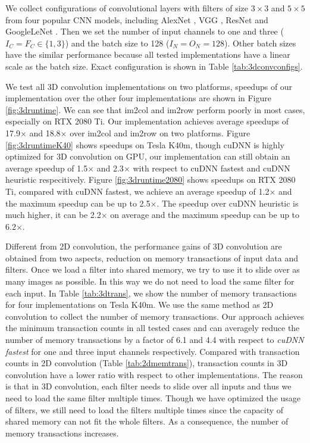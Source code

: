 We collect configurations of convolutional layers with filters of size $3 \times 3$ and $5 \times 5$ from four popular CNN models,
including AlexNet \cite{Krizhevsky2012ImageNet}, VGG \cite{SimonyanZ14a}, ResNet \cite{HeZRS16} and GoogleLeNet \cite{SzegedyLJSRAEVR15}.
Then we set the number of input channels to one and three ($I_C=F_C \in \{1, 3\}$) and the batch size to 128 ($I_N=O_N=128$). Other batch
sizes have the similar performance because all tested implementations have a linear scale as the batch size. Exact configuration is shown
in Table \ref{tab:3dconvconfigs}.

We test all 3D convolution implementations on two platforms, speedups of our implementation over the other four implementations are shown
in Figure \ref{fig:3druntime}. We can see that im2col and im2row perform poorly in most cases, especially on RTX 2080 Ti. Our
implementation achieves average speedups of 17.9$\times$ and 18.8$\times$ over im2col and im2row on two platforms. Figure
\ref{fig:3druntimeK40} shows speedups on Tesla K40m, though cuDNN is highly optimized for 3D convolution on GPU, our implementation can
still obtain an average speedup of 1.5$\times$ and 2.3$\times$ with respect to cuDNN fastest and cuDNN heuristic respecitively. Figure
\ref{fig:3druntime2080} shows speedups on RTX 2080 Ti, compared with cuDNN fastest, we achieve an average speedup of 1.2$\times$ and the
maximum speedup can be up to 2.5$\times$. The speedup over cuDNN heuristic is much higher, it can be 2.2$\times$ on average and the maximum
speedup can be up to 6.2$\times$.

Different from 2D convolution, the performance gains of 3D convolution are obtained from two aspects, reduction on memory transactions of
input data and filters. Once we load a filter into shared memory, we try to use it to slide over as many images as possible. In this way we
do not need to load the same filter for each input. In Table \ref{tab:3dtrans}, we show the number of memory transactions for four
implementations on Tesla K40m. We use the same method as 2D convolution to collect the number of memory transactions. Our approach achieves
the minimum transaction counts in all tested cases and can averagely reduce the number of memory transactions by a factor of 6.1 and 4.4
with respect to \emph{cuDNN fastest} for one and three input channels respectively. Compared with transaction counts in 2D convolution
(Table \ref{tab:2dmemtrans}), transaction counts in 3D convolution have a lower ratio with respect to other implementations. The reason is
that in 3D convolution, each filter needs to slide over all inputs and thus we need to load the same filter multiple times. Though we have
optimized the usage of filters, we still need to load the filters multiple times since the capacity of shared memory can not fit the whole
filters. As a consequence, the number of memory transactions increases.

